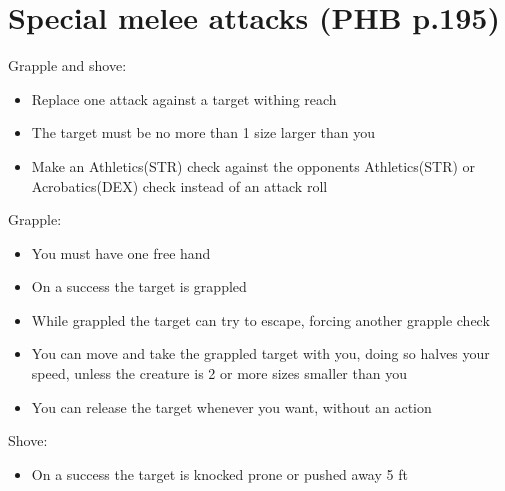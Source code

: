 \documentclass[a4paper]{article}
\begin{document}
\section{Special melee attacks \small (PHB p.195)}
Grapple and shove:
\begin{itemize}
\item Replace one attack against a target withing reach
\item The target must be no more than 1 size larger than you
\item Make an Athletics(STR) check against the opponents Athletics(STR) or Acrobatics(DEX) check instead of an attack roll
\end{itemize}
Grapple:
\begin{itemize}
\item You must have one free hand
\item On a success the target is grappled
\item While grappled the target can try to escape, forcing another grapple check
\item You can move and take the grappled target with you, doing so halves your speed, unless the creature is 2 or more sizes smaller than you
\item You can release the target whenever you want, without an action
\end{itemize}
Shove:
\begin{itemize}
\item On a success the target is knocked prone or pushed away 5 ft
\end{itemize}
\end{document}
